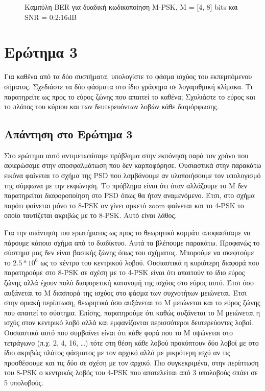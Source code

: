 \documentclass{article}
\begin{document}
        \begin{figure}[H]
        \caption{Καμπύλη BER για δυαδική κωδικοποίηση M-PSK, M = [4, 8] bits και SNR = 0:2:16dB}
        \end{figure}
        
\section{Ερώτημα 3} Για καθένα από τα δύο συστήματα, υπολογίστε το φάσμα ισχύος του εκπεμπόμενου σήματος. Σχεδιάστε τα δύο φάσματα στο ίδιο γράφημα σε λογαριθμική κλίμακα. Τι παρατηρείτε ως προς το εύρος ζώνης που απαιτεί το καθένα; Σχολιάστε το εύρος και το πλάτος του κύριου και των δευτερευόντων
λοβών κάθε διαμόρφωσης.

\subsection*{Απάντηση στο Ερώτημα 3}

Στο ερώτημα αυτό αντιμετωπίσαμε πρόβλημα στην εκπόνηση παρά τον χρόνο που αφιερώσαμε στην αποσφαλμάτωση που δεν καρποφόρησε. Ουσιαστικά στην παρακάτω εικόνα φαίνεται το σχήμα της PSD που λαμβάνουμε αν υλοποιήσουμε τον υπολογισμό της σύμφωνα με την εκφώνηση. Το πρόβλημα είναι ότι όταν αλλάζουμε το Μ δεν παρατηρείται διαφοροποίηση στο PSD όπως θα ήταν αναμενόμενο. Έτσι, στο σχήμα παρότι φαίνεται μόνο το 8-PSK αν γίνει αρκετό zoom φαίνεται και το 4-PSK το οποίο ταυτίζεται ακριβώς με το 8-PSK. Αυτό είναι λάθος.

        \begin{figure}[H]
        \caption{}
        \end{figure}
        
Για την απάντηση του ερωτήματος ως προς το θεωρητικό κομμάτι αποφασίσαμε να πάρουμε κάποιο σχήμα από το διαδίκτυο. Αυτά τα βλέπουμε παρακάτω. Προφανώς το σύστημα μας δεν είναι βασικής ζώνης όπως του σχήματος. Μπορούμε να σκεφτούμε το $2.5 * 10^6$ ως το κέντρο του κεντρικού λοβού. Ουσιαστικά η κυριότερη διαφορά που παρατηρούμε στο 8-PSK σε σχέση με το 4-PSK είναι ότι απαιτούν το ίδιο εύρος ζώνης αλλά έχουν πολύ διαφορετική κατανομή της ισχύος στο εύρος αυτό. Έτσι όσο αυξάνεται το M διασπορά της ισχύος στο φάσμα των συχνοτήτων μειώνεται. Έτσι στην οριακή περίπτωση, θεωρητικά όσο αυξάνεται το M μειώνεται και το εύρος ζώνης που απαιτεί το σύστημα. Επίσης, παρατηρούμε ότι καθώς αυξάνεται το M μειώνεται η ισχύς στον κεντρικό λοβό αλλά και εμφανίζονται περισσότεροι δευτερεύοντες λοβοί. Ουσιαστικά αυτό που συμβαίνει είναι ότι κάθε φορά που το M υψώνεται στο τετράγωνο (π.χ. 2, 4, 16, \dots) τότε στη θέση κάθε λοβού προκύπτουν δύο λοβοί με στο ίδιο ακριβώς πλάτος φάσματος με τον αρχικό αλλά με μικρότερη ισχύ αν τις προσθέσουμε και τις δύο σε σχέση με τον αρχικό. Πιο συγκεκριμένα, στην περίπτωση του 8-PSK ο κεντρικός λοβός του 4-PSK που αποτελείται από 3 υπολοβούς σπάει σε 5 υπολοβούς.
\end{document}
